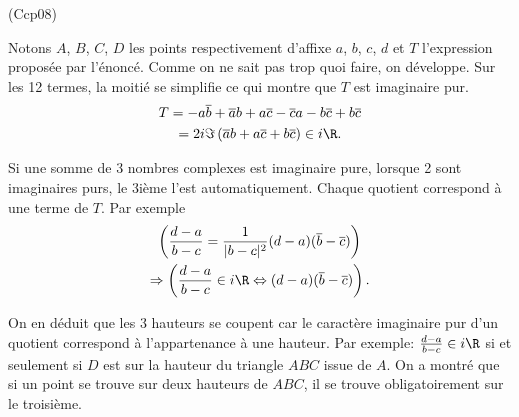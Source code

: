 \begin{tiny}(Ccp08)\end{tiny} Notons $A$, $B$, $C$, $D$ les points respectivement d'affixe $a$, $b$, $c$, $d$ et $T$ l'expression proposée par l'énoncé. Comme on ne sait pas trop quoi faire, on développe. Sur les 12 termes, la moitié se simplifie ce qui montre que $T$ est imaginaire pur.
\begin{multline*}
 T = -a\overline{b} + \overline{a}b  + a\overline{c} - \overline{c} a -b\overline{c} + b\overline{c}\\
 = 2i\Im\left( \overline{a}b  + a\overline{c} + b\overline{c} \right) \in i\R.
\end{multline*}

Si une somme de 3 nombres complexes est imaginaire pure, lorsque 2 sont imaginaires purs, le 3ième l'est automatiquement. Chaque quotient correspond à une terme de $T$. Par exemple
\begin{multline*}
 \left( \frac{d-a}{b-c} = \frac{1}{|b-c|^2}(d-a)(\overline{b} - \overline{c}) \right) \\
 \Rightarrow
\left( \frac{d-a}{b-c} \in i\R \Leftrightarrow (d-a)(\overline{b} - \overline{c})\right) .
\end{multline*}

On en déduit que les 3 hauteurs se coupent car le caractère imaginaire pur d'un quotient correspond à l'appartenance à une hauteur. Par exemple:
$ \frac{d-a}{b-c} \in i\R$ si et seulement si $D$ est sur la hauteur du triangle $ABC$ issue de $A$.\newline
On a montré que si un point se trouve sur deux hauteurs de $ABC$, il se trouve obligatoirement sur le troisième.



